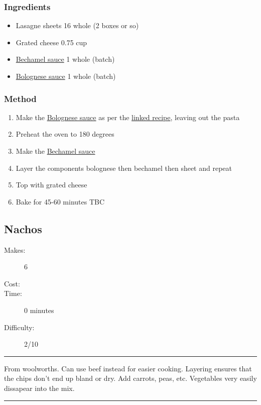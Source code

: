 \documentclass[]{article}
\begin{document}
\subsubsection*{\Large Ingredients}
\begin{multicols}{2}
\begin{itemize}
 \item Lasagne sheets \hfill 16 whole (2 boxes or so)
 \item Grated cheese \hfill 0.75 cup
 \item \hyperref[rec:Bechamel]{Bechamel sauce} \hfill 1 whole (batch)
 \item \hyperref[rec:Bolognese]{Bolognese sauce} \hfill 1 whole (batch)
\end{itemize}
\end{multicols}
\subsubsection*{\Large Method}
\begin{enumerate}[font=\huge\color{accent}]
	\item Make the \hyperref[rec:Bolognese]{Bolognese sauce} as per the \hyperref[rec:Bolognese]{linked recipe}, leaving out the pasta
	\item Preheat the oven to 180 degrees
	\item Make the \hyperref[rec:Bechamel]{Bechamel sauce}
	\item Layer the components bolognese then bechamel then sheet and repeat
	\item Top with grated cheese
	\item Bake for 45-60 minutes TBC
\end{enumerate}
\newpage
{}\label{rec:Nachos}
\subsection*{\center\huge Nachos}
\begin{description}
\item[Makes:] 6 
\item[Cost:] \textdollar
\item[Time:] 0 minutes
\item[Difficulty:] 2/10
\end{description}
\vspace{0.2cm}\hrule\vspace{0.5cm}
\begin{adjustwidth}{0.5 cm}{0.5 cm}

From woolworths. Can use beef instead for easier cooking. Layering ensures that the chips don't end up bland or dry. Add carrots, peas, etc. Vegetables very easily dissapear into the mix. \hfill{}\color{black}

\end{adjustwidth}
\vspace{0.5cm}\hrule
\end{document}
